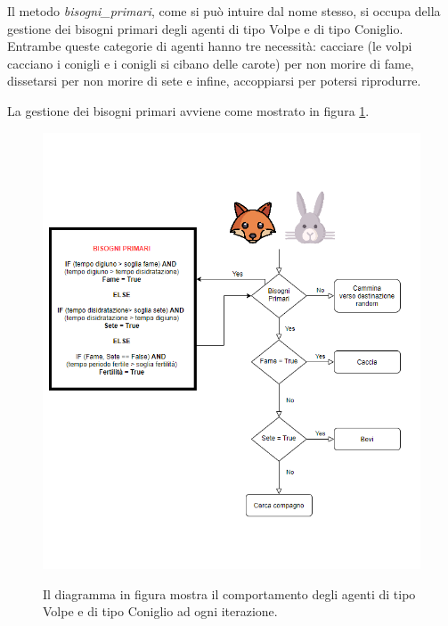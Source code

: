 \documentclass[11pt]{article}
\begin{document}
Il metodo \emph{bisogni\_primari}, come si può intuire dal nome stesso, si occupa della gestione dei bisogni primari degli agenti di tipo Volpe e di tipo Coniglio. Entrambe queste categorie di agenti hanno tre necessità: cacciare (le volpi cacciano i conigli e i conigli si cibano delle carote) per non morire di fame, dissetarsi per non morire di sete e infine, accoppiarsi per potersi riprodurre. 

La gestione dei bisogni primari avviene come mostrato in figura \ref{fig:diagrammaComportamentale}. 
\begin{figure}
     \centering
     \includegraphics[scale = 0.7]{diagramma_comportamentale.png}
     \label{fig:diagrammaComportamentale}
     \caption{Il diagramma in figura mostra il comportamento degli agenti di tipo Volpe e di tipo Coniglio ad ogni iterazione.}
\end{figure}
\end{document}
